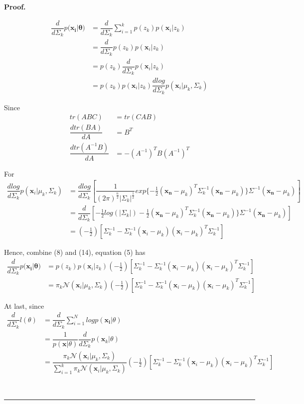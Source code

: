 \documentclass[12pt]{article}%
\newenvironment{proof}[1][Proof]{\textbf{#1.} }{\ \rule{0.5em}{0.5em}}
\begin{document}
\begin{itemize}
\begin{proof}
\begin{itemize}
    		\begin{align}
    		\dfrac{d}{d\Sigma_k}p(\mathbf{\mathbf{x}_i|\theta)} &=
    		\dfrac{d}{d\Sigma_k} \sum_{i=1}^{k} p(z_k) p(\mathbf{x}_i|z_k)\\
    		&= \dfrac{d}{d\Sigma_k} p(z_k) p(\mathbf{x}_i|z_k) \\
    		&= p(z_k) \dfrac{d}{d\Sigma_k} p(\mathbf{x}_i|z_k) \\
    		&= p(z_k) p(\mathbf{x}_i|z_k) \dfrac{dlog}{d\Sigma_k}p(\mathbf{x}_i|\mu_k,\Sigma_k)
    		\end{align}
    		
    		Since \begin{align}
    		tr(ABC) &= tr(CAB) \\
    		\dfrac{dtr(BA)}{dA} &=B^T\\
    		\dfrac{dtr(A^{-1}B)}{dA} &=-(A^{-1})^TB(A^{-1})^T
    		\end{align}
    		
    		For \begin{align}
    		\dfrac{dlog}{d\Sigma_k}p(\mathbf{x}_i|\mu_k,\Sigma_k) 
    		&=\dfrac{dlog}{d\Sigma_k} \left[ \dfrac{1}{(2\pi)^{\frac{n}{2}} |\Sigma_k|^{\frac{1}{2}}}
    		exp\{-\frac{1}{2} (\mathbf{x_n}-\mu_k)^T\Sigma_k^{-1}(\mathbf{x_n}-\mu_k)\} \Sigma^{-1}(\mathbf{x_n}-\mu_k) \right] \\
    		&= \dfrac{d}{d\Sigma_k} \left[-\frac{1}{2}log(|\Sigma_k|) -\frac{1}{2} (\mathbf{x_n}-\mu_k)^T\Sigma_k^{-1}(\mathbf{x_n}-\mu_k)\} \Sigma^{-1}(\mathbf{x_n}-\mu_k)
    		\right] \\
    		&= (-\frac{1}{2}) \left[ \Sigma_k^{-1} - \Sigma_k^{-1}(\mathbf{x}_i - \mu_k)(\mathbf{x}_i - \mu_k)^T\Sigma_k^{-1} \right]
    		\end{align}
    		
    		Hence, combine (8) and (14), equation (5) has
    		\begin{align}
    		\dfrac{d}{d\Sigma_k}p(\mathbf{\mathbf{x}_i|\theta)} 
    		&= p(z_k)p(\mathbf{x}_i|z_k)
    		(-\frac{1}{2}) \left[ \Sigma_k^{-1} - \Sigma_k^{-1}(\mathbf{x}_i - \mu_k)(\mathbf{x}_i - \mu_k)^T\Sigma_k^{-1} \right]\\
    		&= \pi_k\mathcal{N}(\mathbf{x}_i|\mu_k,\Sigma_k) 
    		(-\frac{1}{2}) \left[ \Sigma_k^{-1} - \Sigma_k^{-1}(\mathbf{x}_i - \mu_k)(\mathbf{x}_i - \mu_k)^T\Sigma_k^{-1} \right]
    		\end{align}
    		
    		At last, since
    		\begin{align}
    		\dfrac{d}{d\Sigma_k} l(\theta) &= \dfrac{d}{d\Sigma_k} \sum_{i=1}^{N}log p(\mathbf{x_i}|\theta) \\
    		&=  \dfrac{1}{p(\mathbf{x}|\theta)}  \dfrac{d}{d\Sigma_k} p(\mathbf{x}_k|\theta) \\
    		&=  \dfrac{\pi_k\mathcal{N}(\mathbf{x}_i|\mu_k,\Sigma_k)}
    		{\sum_{i=1}^{k}\pi_k\mathcal{N}(\mathbf{x}_i|\mu_k,\Sigma_k)}
    		(-\frac{1}{2}) \left[ \Sigma_k^{-1} - \Sigma_k^{-1}(\mathbf{x}_i - \mu_k)(\mathbf{x}_i - \mu_k)^T\Sigma_k^{-1} \right]
    		\end{align}
    		

\end{itemize}
\end{proof}
\end{itemize}
\end{document}
